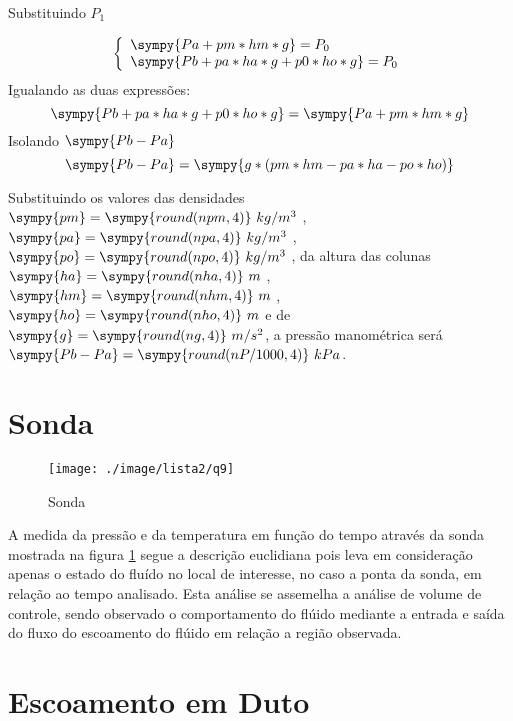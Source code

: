 \documentclass[a4paper,twocolumn,11pt]{article}
\newcommand{\npy}[1]{\sympy{round(n#1,4)}}
\newcommand{\nnpy}[1]{\sympy{#1} = \sympy{round(n#1,4)}}
\begin{document}
Substituindo $P_1$

$$
\left\{
\begin{array}{l}
\sympy{Pa + pm*hm*g} = P_0\\
\sympy{Pb + pa*ha*g + p0*ho*g} = P_0\\
\end{array}
\right.
$$
Igualando as duas expressões:
$$
\sympy{Pb + pa*ha*g + p0*ho*g} = \sympy{Pa + pm*hm*g}
$$
Isolando $\sympy{Pb-Pa}$
\begin{equation}
\sympy{Pb -Pa} = \sympy{g*(pm*hm-pa*ha-po*ho)}
\end{equation}

Substituindo os valores das densidades $\nnpy{pm}\ kg/m^3$ , $\nnpy{pa}\ kg/m^3$ , $\nnpy{po}\ kg/m^3$ , da altura das colunas $\nnpy{ha}\ m$ , $\nnpy{hm}\ m$ , $\nnpy{ho}\ m$ e de $\nnpy{g}\ m/s^2$, a pressão manométrica será $\sympy{Pb -Pa} = \npy{P/1000}\ kPa$.

\section{Sonda} %
\begin{figure}[H]
\centering
\label{fig:l2q9}
\texttt{[image: ./image/lista2/q9]}
\caption{Sonda}
\end{figure}

A medida da pressão e da temperatura em função do tempo através da sonda mostrada na figura \ref{fig:l2q9} segue a descrição euclidiana pois leva em consideração apenas o estado do fluído no local de interesse, no caso a ponta da sonda, em relação ao tempo analisado. Esta análise se assemelha a análise de volume de controle, sendo observado o comportamento do flúido mediante a entrada e saída do fluxo do escoamento do flúido em relação a região observada.

\section{Escoamento em Duto} %


\section{} %
\section{} %
\end{document}
